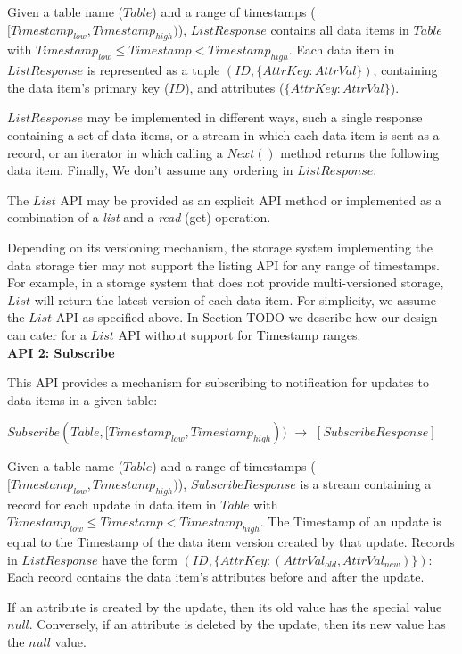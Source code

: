 \noindent
Given a table name ($Table$) and a range of timestamps ($[Timestamp_{low}, Timestamp_{high})$),
$ListResponse$ contains all data items in $Table$ with $Timestamp_{low} \leq Timestamp < Timestamp_{high}$.
Each data item in $ListResponse$ is represented as a tuple $(ID, \{AttrKey: AttrVal\})$, containing the data item's
primary key ($ID$), and attributes ($\{AttrKey: AttrVal\}$).

$ListResponse$ may be implemented in different ways, such a single response containing a set of
data items, or a stream in which each data item is sent as a record, or an iterator in which calling a $Next()$ method
returns the following data item.
Finally, We don't assume any ordering in $ListResponse$.

The $List$ API may be provided as an explicit API method or implemented as a combination of a \textit{list} and a
\textit{read} (get) operation.

Depending on its versioning mechanism, the storage system implementing the data storage tier may not support the
listing API for any range of timestamps.
For example, in a storage system that does not provide multi-versioned storage, $List$ will return the latest version of
each data item.
For simplicity, we assume the $List$ API as specified above.
In Section
TODO
we describe how our design can cater for a $List$ API without support for Timestamp ranges.
\\

\noindent
\textbf{API 2: Subscribe}

\noindent
This API provides a mechanism for subscribing to notification for updates to data items in a given table:

$Subscribe(Table, [Timestamp_{low}, Timestamp_{high}))$ $\rightarrow$ $[SubscribeResponse]$

\noindent
Given a table name ($Table$) and a range of timestamps ($[Timestamp_{low}, Timestamp_{high})$),
$SubscribeResponse$ is a stream containing a record for each update in data item in $Table$
with $Timestamp_{low} \leq Timestamp < Timestamp_{high}$.
The Timestamp of an update is equal to the Timestamp of the data item version created by that update.
Records in $ListResponse$  have the form $(ID, \{AttrKey: (AttrVal_{old}, AttrVal_{new})\})$:
Each record contains the data item's attributes before and after the update.

If an attribute is created by the update, then its old value has the special value $null$.
Conversely, if an attribute is deleted by the update, then its new value has the $null$ value.


